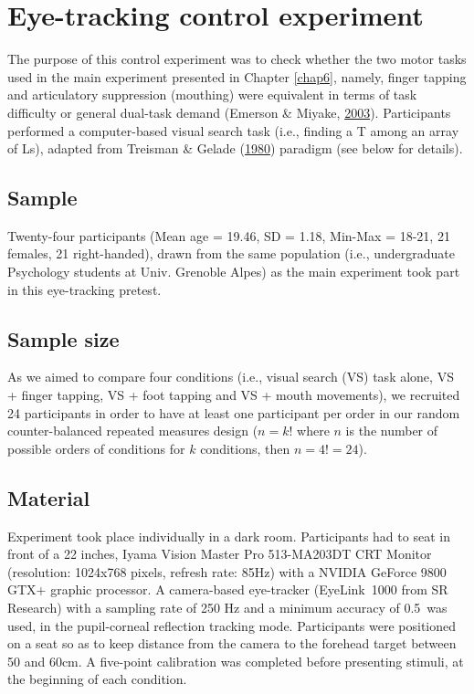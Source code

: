 \documentclass[a4paper,12pt,twoside,onecolumn,openright,final,oldfontcommands]{memoir}
\begin{document}
\hypertarget{appendix-eyetracking}{%
\chapter{Eye-tracking control experiment}\label{appendix-eyetracking}}

The purpose of this control experiment was to check whether the two motor tasks used in the main experiment presented in Chapter \ref{chap6}, namely, finger tapping and articulatory suppression (mouthing) were equivalent in terms of task difficulty or general dual-task demand (Emerson \& Miyake, \protect\hyperlink{ref-emerson_role_2003}{2003}). Participants performed a computer-based visual search task (i.e., finding a T among an array of Ls), adapted from Treisman \& Gelade (\protect\hyperlink{ref-treisman_feature-integration_1980}{1980}) paradigm (see below for details).

\hypertarget{sample-1}{%
\section{Sample}\label{sample-1}}

Twenty-four participants (Mean age = 19.46, SD = 1.18, Min-Max = 18-21, 21 females, 21 right-handed), drawn from the same population (i.e., undergraduate Psychology students at Univ. Grenoble Alpes) as the main experiment took part in this eye-tracking pretest.

\hypertarget{sample-size}{%
\section{Sample size}\label{sample-size}}

As we aimed to compare four conditions (i.e., visual search (VS) task alone, VS + finger tapping, VS + foot tapping and VS + mouth movements), we recruited 24 participants in order to have at least one participant per order in our random counter-balanced repeated measures design (\(n = k!\) where \(n\) is the number of possible orders of conditions for \(k\) conditions, then \(n =4 != 24\)).

\hypertarget{material-5}{%
\section{Material}\label{material-5}}

Experiment took place individually in a dark room. Participants had to seat in front of a 22 inches, Iyama Vision Master Pro 513-MA203DT CRT Monitor (resolution: 1024x768 pixels, refresh rate: 85Hz) with a NVIDIA GeForce 9800 GTX+ graphic processor. A camera-based eye-tracker (EyeLink\textregistered~1000 from SR Research) with a sampling rate of 250 Hz and a minimum accuracy of 0.5\textdegree ~was used, in the pupil-corneal reflection tracking mode. Participants were positioned on a seat so as to keep distance from the camera to the forehead target between 50 and 60cm. A five-point calibration was completed before presenting stimuli, at the beginning of each condition.
\end{document}
